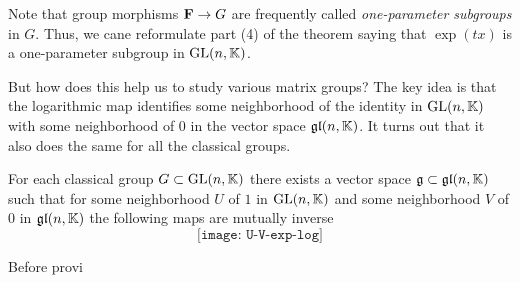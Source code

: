 Note that group morphisms $\mathbf{F}\to G$ are frequently called
\emph{one-parameter subgroups} in $G$. Thus, we cane reformulate part (4)
of the theorem saying that $\exp(tx)$ is a one-parameter subgroup in
$\mathrm{GL}(n,\mathbb{K})$.

But how does this help us to study various matrix groups? The key idea is
that the logarithmic map identifies some neighborhood of the identity in
$\mathrm{GL}(n,\mathbb{K})$ with some neighborhood of $0$ in the vector space
$\mathfrak{gl}(n,\mathbb{K})$. It turns out that it also does the same for all the
classical groups.

\begin{theorem}
  For each classical group $G\subset\mathrm{GL}(n,\mathbb{K})$ there exists a vector
  space $\mathfrak{g}\subset\mathfrak{gl}(n,\mathbb{K})$ such that for some neighborhood $U$
  of $1$ in $\mathrm{GL}(n,\mathbb{K})$ and some neighborhood $V$ of $0$ in
  $\mathfrak{gl}(n,\mathbb{K})$ the following maps are mutually inverse
  \[
    \texttt{[image: U-V-exp-log]}
  \]
\end{theorem}

Before provi

